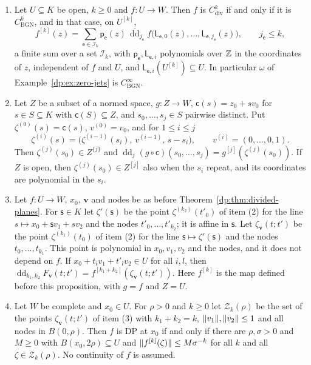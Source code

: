 \begin{proposition}\label{dp:prop:div-bgn}
\leavevmode
\begin{enumerate}
\item Let $U\subseteq K$ be open, $k\ge0$ and $f\colon U\to W$. Then $f$ is $C^k_{\mathrm{div}}$ if and only if it is $C^k_{\mathrm{BGN}}$, and in that case, on $U^{[k]}$,
\begin{equation}\label{dp:sq:explicit}
 f^{[k]}(z)=\sum_{\mathsf e\in\mathcal I_k}\mathsf p_{\mathsf e}(z)\,\overline{\operatorname{dd}}_{j_{\mathsf e}}f\bigl(\mathsf L_{\mathsf e,0}(z),\dots,\mathsf L_{\mathsf e,j_{\mathsf e}}(z)\bigr),\qquad j_{\mathsf e}\le k,
\end{equation}
a finite sum over a set $\mathcal I_k$, with $\mathsf p_{\mathsf e},\mathsf L_{\mathsf e,i}$ polynomials over $\mathbb Z$ in the coordinates of $z$, independent of $f$ and $U$, and $\mathsf L_{\mathsf e,i}(U^{[k]})\subseteq U$. In particular $\omega$ of Example~\textup{\ref{dp:ex:zero-jets}} is $C^\infty_{\mathrm{BGN}}$.
\item Let $Z$ be a subset of a normed space, $g\colon Z\to W$, $\mathsf c(s)=z_0+sv_0$ for $s\in S\subseteq K$ with $\mathsf c(S)\subseteq Z$, and $s_0,\dots,s_j\in S$ pairwise distinct. Put $\zeta^{(0)}(s)=\mathsf c(s)$, $v^{(0)}=v_0$, and for $1\le i\le j$
\[
 \zeta^{(i)}(s)=\bigl(\zeta^{(i-1)}(s_i),\,v^{(i-1)},\,s-s_i\bigr),\qquad v^{(i)}=(0,\dots,0,1).
\]
Then $\zeta^{(j)}(s_0)\in Z^{\{j\}}$ and $\operatorname{dd}_j(g\circ\mathsf c)(s_0,\dots,s_j)=g^{[j]}(\zeta^{(j)}(s_0))$. If $Z$ is open, then $\zeta^{(j)}(s_0)\in Z^{[j]}$ also when the $s_i$ repeat, and its coordinates are polynomial in the $s_i$.
\item Let $f\colon U\to W$, $x_0$, $\mathbf v$ and nodes be as before Theorem~\textup{\ref{dp:thm:divided-planes}}. For $\mathsf s\in K$ let $\zeta'(\mathsf s)$ be the point $\zeta^{(k_2)}(t'_0)$ of item \textup{(2)} for the line $s\mapsto x_0+\mathsf sv_1+sv_2$ and the nodes $t'_0,\dots,t'_{k_2}$; it is affine in $\mathsf s$. Let $\zeta_{\mathbf v}(t;t')$ be the point $\zeta^{(k_1)}(t_0)$ of item \textup{(2)} for the line $\mathsf s\mapsto\zeta'(\mathsf s)$ and the nodes $t_0,\dots,t_{k_1}$. This point is polynomial in $x_0,v_1,v_2$ and the nodes, and it does not depend on $f$. If $x_0+t_iv_1+t'_lv_2\in U$ for all $i,l$, then $\operatorname{dd}_{k_1,k_2}F_{\mathbf v}(t;t')=f^{[k_1+k_2]}(\zeta_{\mathbf v}(t;t'))$. Here $f^{[k]}$ is the map defined before this proposition, with $g=f$ and $Z=U$.
\item Let $W$ be complete and $x_0\in U$. For $\rho>0$ and $k\ge0$ let $\mathcal Z_k(\rho)$ be the set of the points $\zeta_{\mathbf v}(t;t')$ of item \textup{(3)} with $k_1+k_2=k$, $\lVert v_1\rVert,\lVert v_2\rVert\le1$ and all nodes in $B(0,\rho)$. Then $f$ is DP at $x_0$ if and only if there are $\rho,\sigma>0$ and $M\ge0$ with $B(x_0,2\rho)\subseteq U$ and $\lVert f^{[k]}(\zeta)\rVert\le M\sigma^{-k}$ for all $k$ and all $\zeta\in\mathcal Z_k(\rho)$. No continuity of $f$ is assumed.
\end{enumerate}
\end{proposition}

